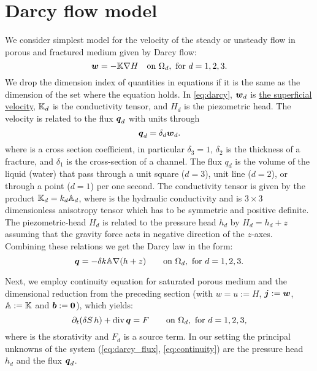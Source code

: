 
\section{Darcy flow model} \label{sec:darcy_flow}
We consider simplest model for the velocity of the steady or unsteady flow in porous and fractured medium given by 
Darcy flow:
\begin{equation}
    \label{eq:darcy}
    \vc w = -\tn K \grad H \quad\text{on }\Omega_d,\ \text{for $d=1,2,3$}.
\end{equation}
We drop the dimension index of quantities in equations if it is the same as the dimension of the set where the equation holds.
In \eqref{eq:darcy}, $\mathbf{\boldsymbol{w}}_d$  is \href{http://en.wikipedia.org/wiki/Superficial_velocity}{the superficial velocity},
${\mathbb{K}}_d$ is the conductivity tensor, and $H_d$  is the piezometric head. The velocity is related to the flux $\mathbf{\boldsymbol{q}}_d$ 
with units  through
\[
    \mathbf{\boldsymbol{q}}_d = \delta_d \mathbf{\boldsymbol{w}}_d.
\]
where 
 is a cross section coefficient, in particular $\delta_3=1$, $\delta_2$  is the thickness of a fracture, and $\delta_1$  is the cross-section of a channel.
The flux $q_d$ is the volume of the liquid (water) that pass through a unit square ($d=3$),
unit line ($d=2$), or through a point ($d=1$) per one second. 
The conductivity tensor is given by the product 
${\mathbb{K}}_d = k_d {\mathbb{A}}_d$, where 
 is the hydraulic conductivity  and 
 is 
$3\times 3$ dimensionless anisotropy tensor which has to be symmetric and positive definite. The piezometric-head $H_d$ is related to the pressure head
$h_d$ by $H_d = h_d + z$ assuming that the gravity force acts in negative direction of the $z$-axes. 
Combining these relations we get the Darcy law in the form:
\begin{equation}
    \label{eq:darcy_flux}
    \vc q = -\delta k\tn A \grad (h+z)  \qquad\text{on }\Omega_d,\ \text{for $d=1,2,3$}.
\end{equation}

Next, we employ continuity equation for saturated porous medium and the dimensional reduction from the preceding section (with $w=u:=H$, $\mathbf{\boldsymbol{j}}:=\mathbf{\boldsymbol{w}}$, ${\mathbb{A}}:={\mathbb{K}}$ and $\mathbf{\boldsymbol{b}}:=\mathbf{\boldsymbol{0}}$), which yields:
\begin{equation}
    \label{eq:continuity}
    \prtl_t (\delta S\, h) + \div \vc q = F \qquad \text{on }\Omega_d,\ \text{for $d=1,2,3$},
\end{equation}
where   is the storativity and $F_d$  is a source term. In our setting the principal unknowns of the system 
(\ref{eq:darcy_flux}, \ref{eq:continuity}) are the pressure head $h_d$ and the flux $\mathbf{\boldsymbol{q}}_d$.



